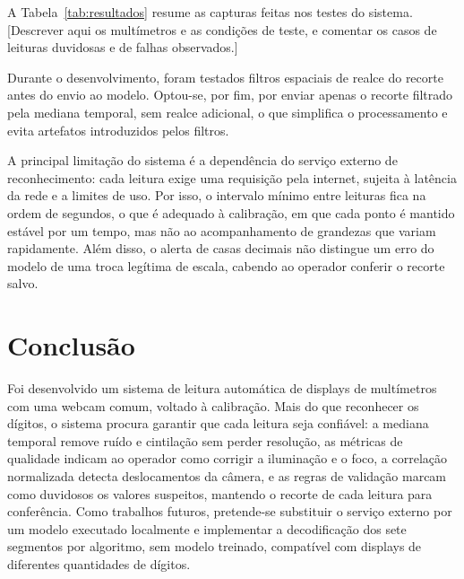 \documentclass[10pt,twocolumn,letterpaper]{article}
\begin{document}
A Tabela~\ref{tab:resultados} resume as capturas feitas nos testes do sistema.
[Descrever aqui os multímetros e as condições de teste, e comentar os casos de
leituras duvidosas e de falhas observados.]

Durante o desenvolvimento, foram testados filtros espaciais de realce do
recorte antes do envio ao modelo. Optou-se, por fim, por enviar apenas o
recorte filtrado pela mediana temporal, sem realce adicional, o que simplifica
o processamento e evita artefatos introduzidos pelos filtros.

A principal limitação do sistema é a dependência do serviço externo de
reconhecimento: cada leitura exige uma requisição pela internet, sujeita à
latência da rede e a limites de uso. Por isso, o intervalo mínimo entre
leituras fica na ordem de segundos, o que é adequado à calibração, em que cada
ponto é mantido estável por um tempo, mas não ao acompanhamento de grandezas
que variam rapidamente. Além disso, o alerta de casas decimais não distingue um
erro do modelo de uma troca legítima de escala, cabendo ao operador conferir o
recorte salvo.

\section{Conclusão}

Foi desenvolvido um sistema de leitura automática de displays de multímetros
com uma webcam comum, voltado à calibração. Mais do que reconhecer os dígitos,
o sistema procura garantir que cada leitura seja confiável: a mediana temporal
remove ruído e cintilação sem perder resolução, as métricas de qualidade
indicam ao operador como corrigir a iluminação e o foco, a correlação
normalizada detecta deslocamentos da câmera, e as regras de validação marcam
como duvidosos os valores suspeitos, mantendo o recorte de cada leitura para
conferência. Como trabalhos futuros, pretende-se substituir o serviço externo
por um modelo executado localmente e implementar a decodificação dos sete
segmentos por algoritmo, sem modelo treinado, compatível com displays de
diferentes quantidades de dígitos.

\end{document}
